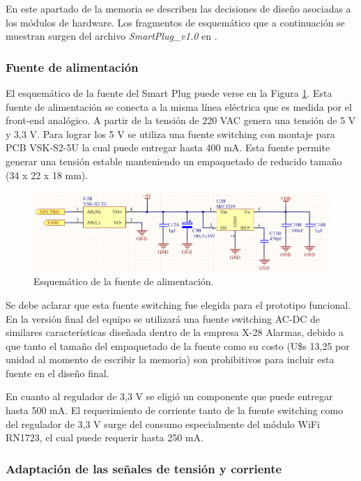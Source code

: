 En este apartado de la memoria se describen las decisiones de diseño asociadas a los módulos de hardware. Los fragmentos de esquemático que a continuación se muestran surgen del archivo \textit{SmartPlug\_v1.0} en \citep{repo_hardware}.

\subsubsection{Fuente de alimentación}

El esquemático de la fuente del Smart Plug puede verse en la Figura \ref{fig:pcb_fuente}. Esta fuente de alimentación se conecta a la misma línea eléctrica que es medida por el front-end analógico. A partir de la tensión de 220 VAC genera una tensión de 5 V y 3,3 V. Para lograr los 5 V se utiliza una fuente switching con montaje para PCB VSK-S2-5U la cual puede entregar hasta 400 mA. Esta fuente permite generar una tensión estable manteniendo un empaquetado de reducido tamaño (34 x 22 x 18 mm). 

\begin{figure}[h]
	\centering
	\includegraphics[width=14cm]{./Figures/3_1_2_pcb_fuente.png}
	\caption{Esquemático de la fuente de alimentación.}
	\label{fig:pcb_fuente}
\end{figure}


Se debe aclarar que esta fuente switching fue elegida para el prototipo funcional. En la versión final del equipo se utilizará una fuente switching AC-DC de similares características diseñada dentro de la empresa X-28 Alarmas, debido a que tanto el tamaño del empaquetado de la fuente como su costo (U\$s 13,25 por unidad al momento de escribir la memoria) son prohibitivos para incluir esta fuente en el diseño final.

En cuanto al regulador de 3,3 V se eligió un componente que puede entregar hasta 500 mA. El requerimiento de corriente tanto de la fuente switching como del regulador de 3,3 V surge del consumo especialmente del módulo WiFi RN1723, el cual puede requerir hasta 250 mA.


\subsubsection{Adaptación de las señales de tensión y corriente}

